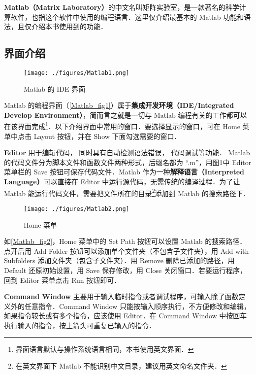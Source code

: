 
\textbf{Matlab（Matrix Laboratory）}的中文名叫矩阵实验室，是一款著名的科学计算软件，也指这个软件中使用的编程语言．这里仅介绍最基本的 Matlab 功能和语法，且仅介绍本书使用到的功能．


\subsection{界面介绍}

\begin{figure}[ht]
\centering
\texttt{[image: ./figures/Matlab1.png]}
\caption{Matlab 的 IDE 界面}\label{Matlab_fig1}
\end{figure}

Matlab 的编程界面（\autoref{Matlab_fig1}）属于\textbf{集成开发环境（IDE/Integrated Develop Environment）}，简而言之就是一切与 Matlab 编程有关的工作都可以在该界面完成\footnote{界面语言默认与操作系统语言相同，本书使用英文界面．}．以下介绍界面中常用的窗口．要选择显示的窗口，可在 Home 菜单中点击 Layout 按钮，并在 Show 下面勾选需要的窗口．

\textbf{Editor} 用于编辑代码， 同时具有自动检测语法错误， 代码调试等功能． Matlab 的代码文件分为脚本文件和函数文件两种形式，后缀名都为 “.m”，用图1中 Editor 菜单栏的 Save 按钮可保存代码文件．Matlab 作为一种\textbf{解释语言（Interpreted Language）}可以直接在 Editor 中运行源代码，无需传统的编译过程．为了让 Matlab 能运行代码文件，需要把文件所在的目录\footnote{在英文界面下 Matlab 不能识别中文目录，建议用英文命名文件夹．}添加到 Matlab 的搜索路径下．

\begin{figure}[ht]
\centering
\texttt{[image: ./figures/Matlab2.png]}
\caption{Home 菜单}\label{Matlab_fig2}
\end{figure}

如\autoref{Matlab_fig2}，Home 菜单中的 Set Path 按钮可以设置 Matlab 的搜索路径．点开后用 Add Folder 按钮可以添加单个文件夹（不包含子文件夹），用 Add with Subfolders 添加文件夹（包含子文件夹）．用 Remove 删除已添加的路径，用 Default 还原初始设置，用 Save 保存修改，用 Close 关闭窗口．若要运行程序，回到 Editor 菜单点击 Run 按钮即可．

\textbf{Command Window} 主要用于输入临时指令或者调试程序，可输入除了函数定义外的任意指令．Command Window 只能按输入顺序执行，不方便修改和编辑，如果指令较长或有多个指令，应该使用 Editor．在 Command Window 中按回车执行输入的指令，按上箭头可重复已输入的指令．

